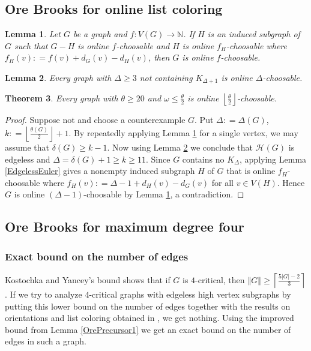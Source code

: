 \documentclass[12pt]{article}
\theoremstyle{plain}
\newtheorem{thm}{Theorem}[section]
\newtheorem{lem}[thm]{Lemma}
\theoremstyle{definition}
\theoremstyle{remark}
\newcommand{\fancy}[1]{\mathcal{#1}}
\newcommand{\IN}{\mathbb{N}}
\newcommand{\HH}{\fancy{H}}
\newcommand{\card}[1]{\left|#1\right|}
\newcommand{\size}[1]{\left\Vert#1\right\Vert}
\newcommand{\ceil}[1]{\left\lceil#1\right\rceil}
\newcommand{\floor}[1]{\left\lfloor#1\right\rfloor}
\newcommand{\func}[3]{#1\colon #2 \rightarrow #3}
\newcommand{\DefinedAs}{\mathrel{\mathop:}=}
\begin{document}
\subsection{Ore Brooks for online list coloring}
\begin{lem}\label{CutLemma}
Let $G$ be a graph and $\func{f}{V(G)}{\IN}$.  If $H$ is an induced subgraph of $G$ such that $G-H$ is online $f$-choosable and $H$ is online $f_H$-choosable where $f_H(v) \DefinedAs f(v) + d_G(v) - d_H(v)$, then $G$ is online $f$-choosable.
\end{lem}

\begin{lem}\label{BrooksOnline}
Every graph with $\Delta \geq 3$ not containing $K_{\Delta+1}$ is online $\Delta$-choosable.
\end{lem}

\begin{thm}\label{OurListOnlineOre}
Every graph with $\theta \geq 20$ and $\omega \leq \frac{\theta}{2}$ is online $\floor{\frac{\theta}{2}}$-choosable.
\end{thm}
\begin{proof}
Suppose not and choose a counterexample $G$.  Put $\Delta \DefinedAs \Delta(G)$, $k \DefinedAs \floor{\frac{\theta(G)}{2}} + 1$.  By repeatedly applying Lemma \ref{CutLemma} for a single vertex, we may assume that $\delta(G) \geq k - 1$. Now using Lemma \ref{BrooksOnline} we conclude that $\HH(G)$ is edgeless and $\Delta = \delta(G) + 1 \geq k \geq 11$. Since $G$ contains no $K_\Delta$, applying Lemma \ref{EdgelessEuler} gives a nonempty induced subgraph $H$ of $G$ that is online $f_H$-choosable where $f_H(v) \DefinedAs \Delta - 1 + d_H(v) - d_G(v)$ for all $v \in V(H)$.  Hence $G$ is online $(\Delta - 1)$-choosable by Lemma \ref{CutLemma}, a contradiction.
\end{proof}

\subsection{Ore Brooks for maximum degree four}
\subsubsection{Exact bound on the number of edges}
Kostochka and Yancey's bound \cite{kostochkayancey2012ore} shows that if $G$ is $4$-critical, then $\size{G} \geq \ceil{\frac{5\card{G}-2}{3}}$.  If we try to analyze $4$-critical graphs with edgeless high vertex subgraphs by putting this lower bound on the number of edges together with the results on orientations and list coloring obtained in \cite{kostochkayancey2012ore}, we get nothing.  Using the improved bound from Lemma \ref{OrePrecursor1} we get an exact bound on the number of edges in such a graph.
\end{document}
